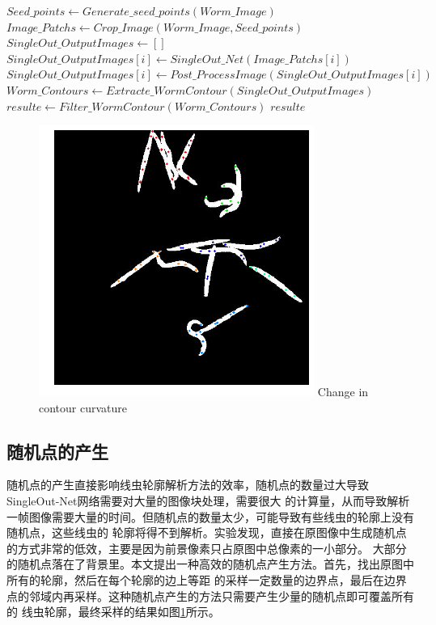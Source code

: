 \begin{algorithm}
\begin{algorithmic}[1]
		\State $Seed\_points \gets Generate\_seed\_points(Worm\_Image)$
		\State $Image\_Patchs \gets Crop\_Image(Worm\_Image,Seed\_points)$
		\State $SingleOut\_OutputImages \gets []$
			\State $SingleOut\_OutputImages[i] \gets SingleOut\_Net(Image\_Patchs[i])$
			\State $SingleOut\_OutputImages[i] \gets Post\_ProcessImage(SingleOut\_OutputImages[i])$
		\EndFor
		\State $Worm\_Contours \gets Extracte\_WormContour(SingleOut\_OutputImages)$
		\State $resulte \gets Filter\_WormContour(Worm\_Contours)$
		\State \Return $resulte$
\EndFunction
\end{algorithmic}
\end{algorithm}
		\begin{figure}[htp]
	  \centering
	  \includegraphics[width=9cm]{figure/chap4/rand_seed.png}
		{Change in contour curvature}
	  \label{fig:chap4:rand_seed}
	\end{figure}
\subsection{随机点的产生}
	随机点的产生直接影响线虫轮廓解析方法的效率，随机点的数量过大导致SingleOut-Net网络需要对大量的图像块处理，需要很大
	的计算量，从而导致解析一帧图像需要大量的时间。但随机点的数量太少，可能导致有些线虫的轮廓上没有随机点，这些线虫的
	轮廓将得不到解析。实验发现，直接在原图像中生成随机点的方式非常的低效，主要是因为前景像素只占原图中总像素的一小部分。
	大部分的随机点落在了背景里。本文提出一种高效的随机点产生方法。首先，找出原图中所有的轮廓，然后在每个轮廓的边上等距
	的采样一定数量的边界点，最后在边界点的邻域内再采样。这种随机点产生的方法只需要产生少量的随机点即可覆盖所有的
	线虫轮廓，最终采样的结果如图\ref{fig:chap4:rand_seed}所示。

